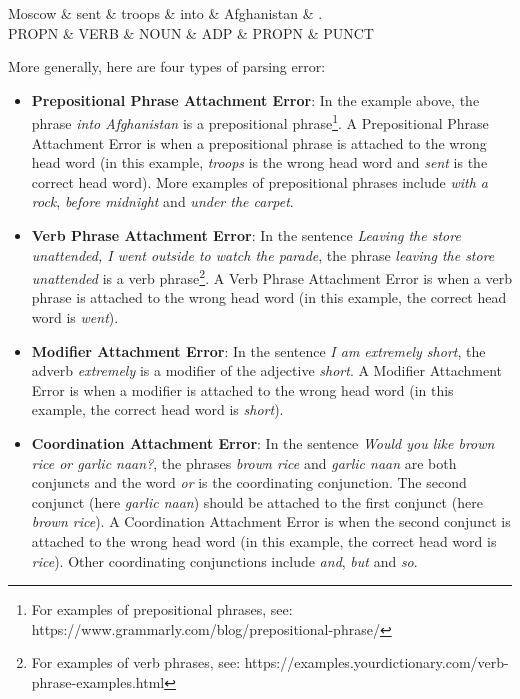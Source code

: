 \begin{parts}
\begin{center}
 {
 \begin{dependency}
 \begin{deptext}
Moscow  \& sent \& troops \& into  \& Afghanistan \& .     \\
 PROPN \& VERB  \& NOUN  \& ADP \& PROPN \& PUNCT \\
 \end{deptext}
 \end{dependency}
 }
 \end{center}

More generally, here are four types of parsing error:
\begin{itemize}
    \item \textbf{Prepositional Phrase Attachment Error}: In the example above, the phrase \textit{into Afghanistan} is a prepositional phrase\footnote{For examples of prepositional phrases, see: https://www.grammarly.com/blog/prepositional-phrase/}.
    A Prepositional Phrase Attachment Error is when a prepositional phrase is attached to the wrong head word (in this example, \textit{troops} is the wrong head word and \textit{sent} is the correct head word).
    More examples of prepositional phrases include \textit{with a rock}, \textit{before midnight} and \textit{under the carpet}. 
    \item \textbf{Verb Phrase Attachment Error}: In the sentence \textit{Leaving the store unattended, I went outside to watch the parade}, the phrase \textit{leaving the store unattended} is a verb phrase\footnote{For examples of verb phrases, see: https://examples.yourdictionary.com/verb-phrase-examples.html}. 
    A Verb Phrase Attachment Error is when a verb phrase is attached to the wrong head word (in this example, the correct head word is \textit{went}).
    \item \textbf{Modifier Attachment Error}: In the sentence \textit{I am extremely short}, the adverb \textit{extremely} is a modifier of the adjective \textit{short}. A Modifier Attachment Error is when a modifier is attached to the wrong head word (in this example, the correct head word is \textit{short}).
    \item \textbf{Coordination Attachment Error}: In the sentence \textit{Would you like brown rice or garlic naan?}, the phrases \textit{brown rice} and \textit{garlic naan} are both conjuncts and the word \textit{or} is the coordinating conjunction. The second conjunct (here \textit{garlic naan}) should be attached to the first conjunct (here \textit{brown rice}). A Coordination Attachment Error is when the second conjunct is attached to the wrong head word (in this example, the correct head word is \textit{rice}). Other coordinating conjunctions include \textit{and}, \textit{but} and \textit{so}.

\end{itemize}
\end{parts}
